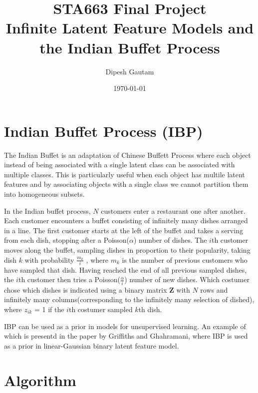 \documentclass{article}
\begin{document}
\title{STA663 Final Project \\ Infinite Latent Feature Models and the Indian Buffet Process}
\author{Dipesh Gautam}
\date{\today}
\maketitle

\section{Indian Buffet Process (IBP)}

The Indian Buffet is an adaptation of Chinese Buffett Process where each object instead of being associated with a single latent class can  be associated with multiple classes. This is particularly useful when each object has multile latent features and by associating objects with a single class we cannot partition them into homogeneous subsets.

In the Indian buffet process, $N$ customers enter a restaurant one after another. Each customer encounters a buffet 
consisting of infinitely many dishes arranged in a line. The first customer starts at the left of the buffet and 
takes a serving from each dish, stopping after a Poisson($\alpha$) number of dishes. The $i$th customer moves along the buffet, 
sampling dishes in proportion to their popularity, taking dish $k$ with probability $\frac{m_k}{i}$ , where $m_k$ is the number of 
previous customers who have sampled that dish. Having reached the end of all previous sampled dishes, the $i$th customer 
then tries a Poisson($\frac{\alpha}{i}$) number of new dishes. Which costumer chose which dishes is indicated using a binary matrix \textbf{Z} with $N$ rows and infinitely many columns(corresponding to the infinitely many selection of dished), where $z_{ik}$ = 1 if the $i$th costumer sampled $k$th dish.

IBP can be used as a prior in models for unsupervised learning. An example of which is presentd in the paper by Griffiths and Ghahramani, where IBP is used as a prior in linear-Gaussian binary latent feature model.


\section{Algorithm}
\end{document}
